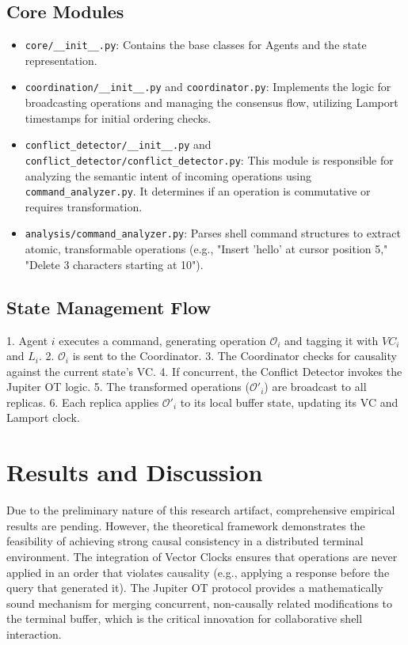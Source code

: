 \documentclass[11pt,a4paper]{article}
\begin{document}
\subsection{Core Modules}
\begin{itemize}
    \item \texttt{core/\_\_init\_\_.py}: Contains the base classes for Agents and the state representation.
    \item \texttt{coordination/\_\_init\_\_.py} and \texttt{coordinator.py}: Implements the logic for broadcasting operations and managing the consensus flow, utilizing Lamport timestamps for initial ordering checks.
    \item \texttt{conflict\_detector/\_\_init\_\_.py} and \texttt{conflict\_detector/conflict\_detector.py}: This module is responsible for analyzing the semantic intent of incoming operations using \texttt{command\_analyzer.py}. It determines if an operation is commutative or requires transformation.
    \item \texttt{analysis/command\_analyzer.py}: Parses shell command structures to extract atomic, transformable operations (e.g., "Insert 'hello' at cursor position 5," "Delete 3 characters starting at 10").
\end{itemize}

\subsection{State Management Flow}
1. Agent $i$ executes a command, generating operation $\mathcal{O}_i$ and tagging it with $VC_i$ and $L_i$.
2. $\mathcal{O}_i$ is sent to the Coordinator.
3. The Coordinator checks for causality against the current state's VC.
4. If concurrent, the Conflict Detector invokes the Jupiter OT logic.
5. The transformed operations ($\mathcal{O}'_i$) are broadcast to all replicas.
6. Each replica applies $\mathcal{O}'_i$ to its local buffer state, updating its VC and Lamport clock.

\section{Results and Discussion}
Due to the preliminary nature of this research artifact, comprehensive empirical results are pending. However, the theoretical framework demonstrates the feasibility of achieving strong causal consistency in a distributed terminal environment. The integration of Vector Clocks ensures that operations are never applied in an order that violates causality (e.g., applying a response before the query that generated it). The Jupiter OT protocol provides a mathematically sound mechanism for merging concurrent, non-causally related modifications to the terminal buffer, which is the critical innovation for collaborative shell interaction.
\end{document}
